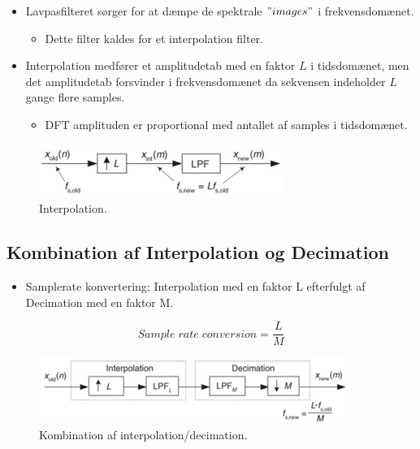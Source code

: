 \documentclass[danish]{article}
\begin{document}
\begin{itemize}
	\item Lavpasfilteret sørger for at dæmpe de spektrale $"images"$ i frekvensdomænet.
	\begin{itemize}
		\item Dette filter kaldes for et interpolation filter.
	\end{itemize}
	\item Interpolation medfører et amplitudetab med en faktor $L$ i tidsdomænet, men det amplitudetab forsvinder i frekvensdomænet da sekvensen indeholder $L$ gange flere samples.
	\begin{itemize}
		\item DFT amplituden er proportional med antallet af samples i tidsdomænet.
	\end{itemize}
\end{itemize}


\begin{figure}[H]
	\centering
	\includegraphics[width=0.5\linewidth]{graphics/Interpolation2}
	\caption{Interpolation.}
	\label{fig:Interpolation2}
\end{figure}

\subsection{Kombination af Interpolation og Decimation}
\begin{itemize}
	\item Samplerate konvertering; Interpolation med en faktor L efterfulgt af Decimation med en faktor M.
\end{itemize}

\begin{equation}
Sample\;rate\;conversion = \frac{L}{M}
\end{equation}

\begin{figure}[H]
	\centering
	\includegraphics[width=0.4\linewidth]{graphics/multirate1}
	\caption{Kombination af interpolation/decimation.}
	\label{fig:multirate1}
\end{figure}
\end{document}
